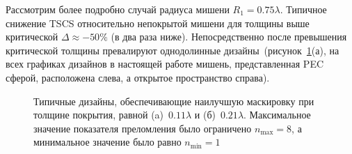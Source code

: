 Рассмотрим более подробно случай радиуса мишени ${R_1 =
  0.75\lambda}$. Типичное снижение TSCS относительно непокрытой мишени
для толщины выше критической ${\Delta \approx -50\%}$ (в два раза
ниже). Непосредственно после превышения критической толщины
превалируют однодолинные дизайны~(рисунок~\ref{img:designs}(а), на
всех графиках дизайнов в настоящей работе мишень, представленная PEC
сферой, расположена слева, а открытое пространство справа).
\begin{figure}
  \hfill
  \begin{minipage}[ht]{0.44\linewidth}
  \end{minipage}
  \hfill
  \begin{minipage}[ht]{0.44\linewidth}
  \end{minipage}
  \caption{Типичные дизайны, обеспечивающие наилучшую маскировку при
    толщине покрытия, равной (a)~$0.11\lambda$ и
    (б)~$0.21\lambda$. Максимальное значение показателя преломления
    было ограничено $n_{\mathrm{max}}=8$, а минимальное значение было
    равно $n_{\mathrm{min}}=1$ }
  \label{img:designs}  
\end{figure}
